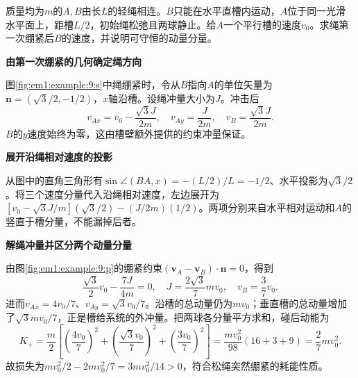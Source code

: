 \begin{question}\begin{example}[松绳绷紧与槽的约束冲量]\label{em1:example:9}
质量均为$m$的$A,B$由长$L$的轻绳相连。$B$只能在水平直槽内运动，$A$位于同一光滑水平面上，距槽$L/2$，初始绳松弛且两球静止。给$A$一个平行槽的速度$v_0$。求绳第一次绷紧后$B$的速度，并说明可守恒的动量分量。
\end{example}
\end{question}
\begin{solution}\textbf{由第一次绷紧的几何确定绳方向}\par\nobreak
图\ref{fig:em1:example:9:s}中绳绷紧时，令从$B$指向$A$的单位矢量为$\bm n=(\sqrt3/2,-1/2)$，$x$轴沿槽。设绳冲量大小为$J$。冲击后
\[v_{Ax}=v_0-\frac{\sqrt3J}{2m},\quad v_{Ay}=\frac{J}{2m},\quad v_B=\frac{\sqrt3J}{2m}.\]
$B$的$y$速度始终为零，这由槽壁额外提供的约束冲量保证。



\par\medskip{}\noindent\textbf{展开沿绳相对速度的投影}\par\nobreak
从图中的直角三角形有$\sin\angle(BA,x)=-(L/2)/L=-1/2$、水平投影为$\sqrt3/2$。将三个速度分量代入沿绳相对速度，左边展开为$[v_0-\sqrt3J/m](\sqrt3/2)-(J/2m)(1/2)$。两项分别来自水平相对运动和$A$的竖直于槽分量，不能漏掉后者。



\par\medskip{}\noindent\textbf{解绳冲量并区分两个动量分量}\par\nobreak
由图\ref{fig:em1:example:9:p}的绷紧约束$(\bm v_A-\bm v_B)\cdot\bm n=0$，得到
\[\frac{\sqrt3}{2}v_0-\frac{7J}{4m}=0,\quad J=\frac{2\sqrt3}{7}mv_0,\quad\boxed{v_B=\frac37v_0}.\]
进而$v_{Ax}=4v_0/7$、$v_{Ay}=\sqrt3v_0/7$。沿槽的总动量仍为$mv_0$；垂直槽的总动量增加了$\sqrt3mv_0/7$，正是槽给系统的外冲量。把两球各分量平方求和，碰后动能为
\[
K_+=\frac m2\left[\left(\frac{4v_0}{7}\right)^2
+\left(\frac{\sqrt3v_0}{7}\right)^2
+\left(\frac{3v_0}{7}\right)^2\right]
=\frac{mv_0^2}{98}(16+3+9)=\frac27mv_0^2.
\]
故损失为$mv_0^2/2-2mv_0^2/7=3mv_0^2/14>0$，符合松绳突然绷紧的耗能性质。\end{solution}
